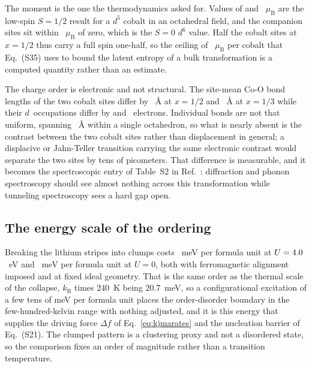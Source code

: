 \documentclass[reprint,twocolumn,prb,amsmath,amssymb,superscriptaddress,floatfix]{revtex4-2}
\newcommand{\kB}{k_{\mathrm{B}}}
\newcommand{\muBs}{\mu_{\mathrm{B}}}
\begin{document}
The moment is the one the thermodynamics asked for. Values of \comomentRow{} and
\comomentXthird~$\muBs$ are the low-spin $S=1/2$ result for a $d^{5}$ cobalt in an octahedral
field, and the companion sites sit within \comomentThreeRow~$\muBs$ of zero, which is the $S=0$
$d^{6}$ value. Half the cobalt sites at $x=1/2$ thus carry a full spin one-half, so the ceiling of
\msatRow~$\muBs$ per cobalt that Eq.~(S35) uses to bound the latent entropy of a bulk
transformation is a computed quantity rather than an estimate.

The charge order is electronic and not structural. The site-mean Co-O bond lengths of the two
cobalt sites differ by \bondRow~\AA{} at $x=1/2$ and \bondXthird~\AA{} at $x=1/3$ while their
$d$~occupations differ by \dnRow{} and \dnXthird~electrons. Individual bonds are not that
uniform, spanning \bondSpanRow~\AA{} within a single octahedron, so what is nearly absent is the
contrast between the two cobalt sites rather than displacement in general; a displacive or
Jahn-Teller transition carrying the same electronic contrast would separate the two sites by
tens of picometers. That difference is measurable, and it becomes the spectroscopic
entry of Table~S2 in Ref.~\cite{SM}: diffraction and phonon spectroscopy should see almost nothing
across this transformation while tunneling spectroscopy sees a hard gap open.

\subsection{The energy scale of the ordering}

Breaking the lithium stripes into clumps costs \deltaEClumped~meV per formula unit at
$U=4.0$~eV and \deltaEClumpedUzero~meV per formula unit at $U=0$, both with ferromagnetic
alignment imposed and at fixed ideal geometry. That is the same order as the thermal scale of
the collapse, $\kB$ times 240~K being 20.7~meV, so a configurational excitation of a few tens of
meV per formula unit places the order-disorder boundary in the few-hundred-kelvin range with
nothing adjusted, and it is this energy that supplies the driving force $\Delta f$ of
Eq.~\eqref{eq:kjmarates} and the nucleation barrier of Eq.~(S21). The clumped pattern is a
clustering proxy and not a disordered state, so the comparison fixes an order of magnitude
rather than a transition temperature.
\end{document}
